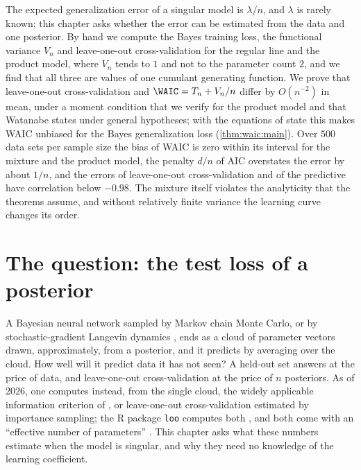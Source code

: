 \newcommand{\waicLOO}{\mathrm{LOO}}
\newcommand{\waicEt}[2]{\mathbb{E}^{(i,#1)}_{w}\!\left[#2\right]}

\begin{refsection}

\begin{chaptersummary}
The expected generalization error of a singular model is $\lambda/n$, and $\lambda$ is rarely known; this chapter asks whether the error can be estimated from the data and one posterior. By hand we compute the Bayes training loss, the functional variance $V_n$ and leave-one-out cross-validation for the regular line and the product model, where $V_n$ tends to $1$ and not to the parameter count $2$, and we find that all three are values of one cumulant generating function. We prove that leave-one-out cross-validation and $\WAIC=T_n+V_n/n$ differ by $O(n^{-2})$ in mean, under a moment condition that we verify for the product model and that Watanabe states under general hypotheses; with the equations of state this makes WAIC unbiased for the Bayes generalization loss (\cref{thm:waic:main}). Over $500$ data sets per sample size the bias of WAIC is zero within its interval for the mixture and the product model, the penalty $d/n$ of AIC overstates the error by about $1/n$, and the errors of leave-one-out cross-validation and of the predictive have correlation below $-0.98$. The mixture itself violates the analyticity that the theorems assume, and without relatively finite variance the learning curve changes its order.
\end{chaptersummary}

\section{The question: the test loss of a posterior}\label{sec:waic:question}

A Bayesian neural network sampled by Markov chain Monte Carlo, or by stochastic-gradient Langevin dynamics \parencite{WellingTeh2011}, ends as a cloud of parameter vectors drawn, approximately, from a posterior, and it predicts by averaging over the cloud. How well will it predict data it has not seen? A held-out set answers at the price of data, and leave-one-out cross-validation at the price of $n$ posteriors. As of 2026, one computes instead, from the single cloud, the widely applicable information criterion of \textcite{Watanabe2010a}, or leave-one-out cross-validation estimated by importance sampling; the R package \texttt{loo} computes both \parencite{VehtariEtAl2017}, and both come with an ``effective number of parameters'' \parencite{GelmanEtAl2014}. This chapter asks what these numbers estimate when the model is singular, and why they need no knowledge of the learning coefficient.


\end{refsection}
